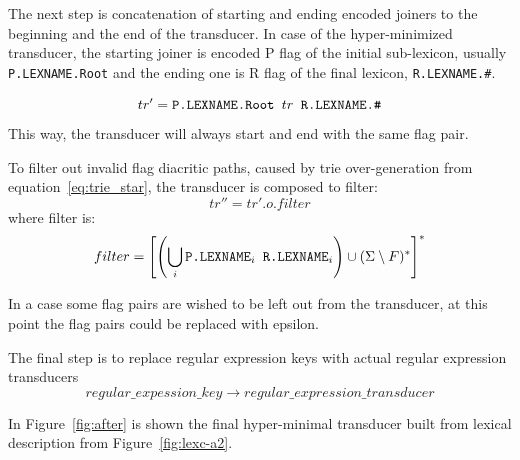 \documentclass[11pt]{article}
\begin{document}
The next step is concatenation of starting and ending encoded joiners to the beginning and the end of the transducer. 
In case of the hyper-minimized transducer, the starting joiner is encoded P flag of the initial sub-lexicon, usually \texttt{P.LEXNAME.Root} and the ending one is R flag of the final lexicon, \texttt{R.LEXNAME.\#}.

\begin{equation}\label{eq:joiners}
tr' = \verb+P.LEXNAME.Root + tr \verb+ R.LEXNAME.#+
\end{equation}
This way, the transducer will always start and end with the same flag pair.

To filter out invalid flag diacritic paths, caused by trie over-generation from equation~\ref{eq:trie_star}, the transducer is composed to filter:
\begin{equation}\label{eq:composition}
tr'' = tr' .o. filter
\end{equation}
where filter is:
\begin{equation}\label{eq:filter}
filter = \left[ \left(\bigcup_{i} \verb+P.LEXNAME+_i \verb+ R.LEXNAME+_i \right) \cup (\Sigma \setminus F) ^*\right]^* 
\end{equation}

In a case some flag pairs are wished to be left out from the transducer, at this point the flag pairs could be replaced with epsilon.


The final step is to replace regular expression keys with actual regular expression transducers
\begin{equation}\label{eq:regex}
regular\_expession\_key \rightarrow regular\_expression\_transducer
\end{equation}

In Figure~\ref{fig:after} is shown the final hyper-minimal transducer built from lexical description from Figure~\ref{fig:lexc-a2}. 
\end{document}

